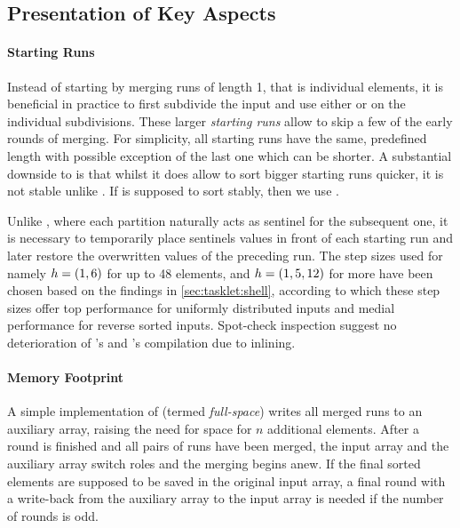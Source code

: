 \subsection{Presentation of Key Aspects}
\label{sec:tasklet:merge:aspects}

\paragraph{Starting Runs}
Instead of starting by merging runs of length 1, that is individual elements, it is beneficial in practice to first subdivide the input and use either \IS{} or \ShS{} on the individual subdivisions.
These larger \emph{starting runs} allow to skip a few of the early rounds of merging.
For simplicity, all starting runs have the same, predefined length with possible exception of the last one which can be shorter.
A substantial downside to \ShS{} is that whilst it does allow to sort bigger starting runs quicker, it is not stable unlike \IS{}.
If \MS{} is supposed to sort stably, then we use \IS{}.

Unlike \QS{}, where each partition naturally acts as sentinel for the subsequent one, it is necessary to temporarily place sentinels values in front of each starting run and later restore the overwritten values of the preceding run.
The step sizes used for \ShS{} \Dash namely \(h = \lparen1, 6\rparen\) for up to 48 elements, and \(h = \lparen1, 5, 12\rparen\) for more \Dash have been chosen based on the findings in \cref{sec:tasklet:shell}, according to which these step sizes offer top performance for uniformly distributed inputs and medial performance for reverse sorted inputs.
Spot-check inspection suggest no deterioration of \IS{}'s and \ShS{}'s compilation due to inlining.


\paragraph{Memory Footprint}
A simple implementation of \MS{} (termed \emph{full-space}) writes all merged runs to an auxiliary array, raising the need for space for \(n\) additional elements.
After a round is finished and all pairs of runs have been merged, the input array and the auxiliary array switch roles and the merging begins anew.
If the final sorted elements are supposed to be saved in the original input array, a final round with a write-back from the auxiliary array to the input array is needed if the number of rounds is odd.

